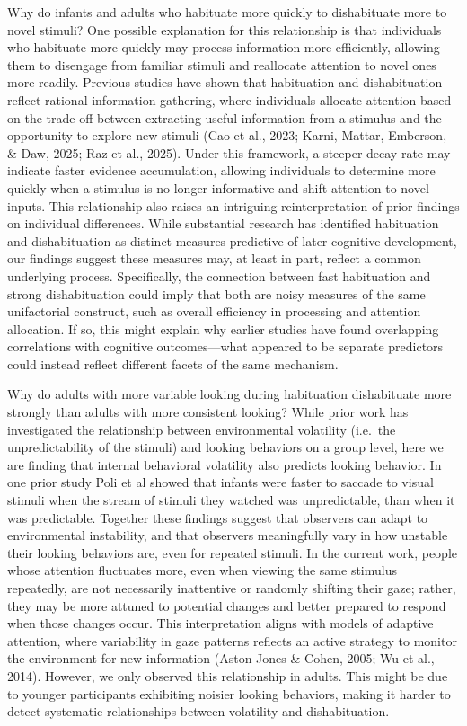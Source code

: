 \documentclass[10pt, letterpaper]{article}
\begin{document}
Why do infants and adults who habituate more quickly to dishabituate
more to novel stimuli? One possible explanation for this relationship is
that individuals who habituate more quickly may process information more
efficiently, allowing them to disengage from familiar stimuli and
reallocate attention to novel ones more readily. Previous studies have
shown that habituation and dishabituation reflect rational information
gathering, where individuals allocate attention based on the trade-off
between extracting useful information from a stimulus and the
opportunity to explore new stimuli (Cao et al., 2023; Karni, Mattar,
Emberson, \& Daw, 2025; Raz et al., 2025). Under this framework, a
steeper decay rate may indicate faster evidence accumulation, allowing
individuals to determine more quickly when a stimulus is no longer
informative and shift attention to novel inputs. This relationship also
raises an intriguing reinterpretation of prior findings on individual
differences. While substantial research has identified habituation and
dishabituation as distinct measures predictive of later cognitive
development, our findings suggest these measures may, at least in part,
reflect a common underlying process. Specifically, the connection
between fast habituation and strong dishabituation could imply that both
are noisy measures of the same unifactorial construct, such as overall
efficiency in processing and attention allocation. If so, this might
explain why earlier studies have found overlapping correlations with
cognitive outcomes---what appeared to be separate predictors could
instead reflect different facets of the same mechanism.

Why do adults with more variable looking during habituation dishabituate
more strongly than adults with more consistent looking? While prior work
has investigated the relationship between environmental volatility
(i.e.~the unpredictability of the stimuli) and looking behaviors on a
group level, here we are finding that internal behavioral volatility
also predicts looking behavior. In one prior study Poli et al showed
that infants were faster to saccade to visual stimuli when the stream of
stimuli they watched was unpredictable, than when it was predictable.
Together these findings suggest that observers can adapt to
environmental instability, and that observers meaningfully vary in how
unstable their looking behaviors are, even for repeated stimuli. In the
current work, people whose attention fluctuates more, even when viewing
the same stimulus repeatedly, are not necessarily inattentive or
randomly shifting their gaze; rather, they may be more attuned to
potential changes and better prepared to respond when those changes
occur. This interpretation aligns with models of adaptive attention,
where variability in gaze patterns reflects an active strategy to
monitor the environment for new information (Aston-Jones \& Cohen, 2005;
Wu et al., 2014). However, we only observed this relationship in adults.
This might be due to younger participants exhibiting noisier looking
behaviors, making it harder to detect systematic relationships between
volatility and dishabituation.
\end{document}
